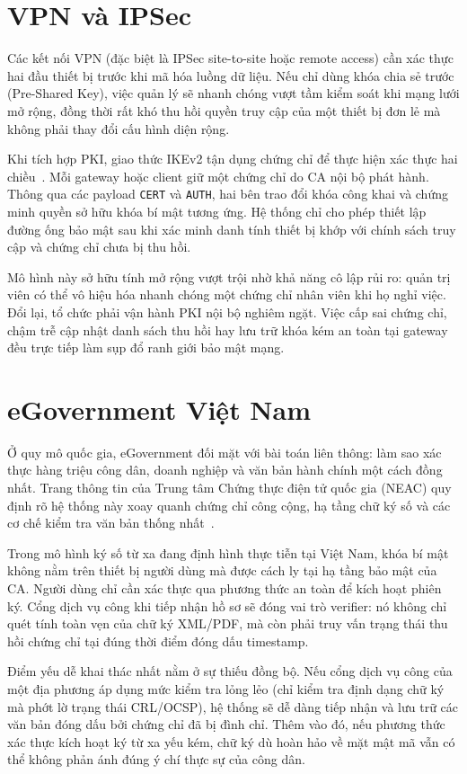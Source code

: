 \section{VPN và IPSec}
\label{sec:5.4}

Các kết nối VPN (đặc biệt là IPSec site-to-site hoặc remote access) cần xác thực hai đầu thiết bị trước khi mã hóa luồng dữ liệu. Nếu chỉ dùng khóa chia sẻ trước (Pre-Shared Key), việc quản lý sẽ nhanh chóng vượt tầm kiểm soát khi mạng lưới mở rộng, đồng thời rất khó thu hồi quyền truy cập của một thiết bị đơn lẻ mà không phải thay đổi cấu hình diện rộng.

Khi tích hợp PKI, giao thức IKEv2 tận dụng chứng chỉ để thực hiện xác thực hai chiều~\cite{RFC7296}. Mỗi gateway hoặc client giữ một chứng chỉ do CA nội bộ phát hành. Thông qua các payload \texttt{CERT} và \texttt{AUTH}, hai bên trao đổi khóa công khai và chứng minh quyền sở hữu khóa bí mật tương ứng. Hệ thống chỉ cho phép thiết lập đường ống bảo mật sau khi xác minh danh tính thiết bị khớp với chính sách truy cập và chứng chỉ chưa bị thu hồi.

Mô hình này sở hữu tính mở rộng vượt trội nhờ khả năng cô lập rủi ro: quản trị viên có thể vô hiệu hóa nhanh chóng một chứng chỉ nhân viên khi họ nghỉ việc. Đổi lại, tổ chức phải vận hành PKI nội bộ nghiêm ngặt. Việc cấp sai chứng chỉ, chậm trễ cập nhật danh sách thu hồi hay lưu trữ khóa kém an toàn tại gateway đều trực tiếp làm sụp đổ ranh giới bảo mật mạng.

\section{eGovernment Việt Nam}
\label{sec:5.5}

Ở quy mô quốc gia, eGovernment đối mặt với bài toán liên thông: làm sao xác thực hàng triệu công dân, doanh nghiệp và văn bản hành chính một cách đồng nhất. Trang thông tin của Trung tâm Chứng thực điện tử quốc gia (NEAC) quy định rõ hệ thống này xoay quanh chứng chỉ công cộng, hạ tầng chữ ký số và các cơ chế kiểm tra văn bản thống nhất~\cite{NEAC}.

Trong mô hình ký số từ xa đang định hình thực tiễn tại Việt Nam, khóa bí mật không nằm trên thiết bị người dùng mà được cách ly tại hạ tầng bảo mật của CA. Người dùng chỉ cần xác thực qua phương thức an toàn để kích hoạt phiên ký. Cổng dịch vụ công khi tiếp nhận hồ sơ sẽ đóng vai trò verifier: nó không chỉ quét tính toàn vẹn của chữ ký XML/PDF, mà còn phải truy vấn trạng thái thu hồi chứng chỉ tại đúng thời điểm đóng dấu timestamp.

Điểm yếu dễ khai thác nhất nằm ở sự thiếu đồng bộ. Nếu cổng dịch vụ công của một địa phương áp dụng mức kiểm tra lỏng lẻo (chỉ kiểm tra định dạng chữ ký mà phớt lờ trạng thái CRL/OCSP), hệ thống sẽ dễ dàng tiếp nhận và lưu trữ các văn bản đóng dấu bởi chứng chỉ đã bị đình chỉ. Thêm vào đó, nếu phương thức xác thực kích hoạt ký từ xa yếu kém, chữ ký dù hoàn hảo về mặt mật mã vẫn có thể không phản ánh đúng ý chí thực sự của công dân.
